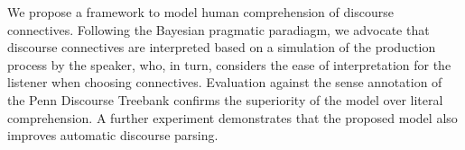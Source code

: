 We propose a framework to model human comprehension of discourse connectives. Following the Bayesian pragmatic paradiagm, we advocate that discourse connectives are interpreted based on a simulation of the production process by the speaker, who, in turn, considers the ease of interpretation for the listener when choosing connectives. Evaluation against the sense annotation of the Penn Discourse Treebank confirms the superiority of the model over literal comprehension. A further experiment demonstrates that the proposed model also improves automatic discourse parsing.
